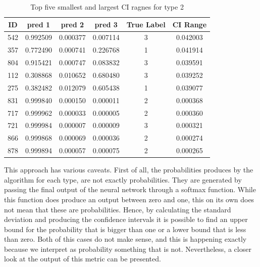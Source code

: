 \documentclass[11pt,twoside]{article}
\numberwithin{Theorem}{section}
\numberwithin{Definition}{section}
\numberwithin{Lemma}{section}
\numberwithin{Algorithm}{section}
\numberwithin{equation}{section}
\begin{document}
\begin{table}[]
\centering
\begin{tabular}{|c|lllcc|}
\hline
ID  & \multicolumn{1}{c}{pred 1}   & \multicolumn{1}{c}{pred 2}   & \multicolumn{1}{c}{pred 3} & True Label & CI Range \\ \hline
542 & 0.992509                     & 0.000377                     & 0.007114                   & 3          & 0.042003 \\
357 & \multicolumn{1}{r}{0.772490} & 0.000741                     & 0.226768                   & 1          & 0.041914 \\
804 & 0.915421                     & 0.000747                     & 0.083832                   & 3          & 0.039591 \\
112 & \multicolumn{1}{r}{0.308868} & 0.010652                     & 0.680480                   & 3          & 0.039252 \\
275 & 0.382482                     & \multicolumn{1}{r}{0.012079} & 0.605438                   & 1          & 0.039077 \\ \hline
831 & 0.999840                     & 0.000150                     & 0.000011                   & 2          & 0.000368 \\
717 & 0.999962                     & 0.000033                     & 0.000005                   & 2          & 0.000360 \\
721 & 0.999984                     & 0.000007                     & 0.000009                   & 3          & 0.000321 \\
866 & 0.999868                     & 0.000069                     & 0.000036                   & 2          & 0.000274 \\
878 & 0.999894                     & 0.000057                     & 0.000075                   & 2          & 0.000265 \\ \hline
\end{tabular}
\caption{Top five smallest and largest CI ragnes for \textsf{type 2}}
\label{tab:CI}
\end{table}

This approach has various caveats. First of all, the probabilities produces by the algorithm for each type, are not exactly probabilities. They are generated by passing the final output of the neural network through a softmax function. While this function does produce an output between zero and one, this on its own does not mean that these are probabilities. Hence, by calculating the standard deviation and producing the confidence intervals it is possible to find an upper bound for the probability that is bigger than one or a lower bound that is less than zero. Both of this cases do not make sense, and this is happening exactly because we interpret as probability something that is not. Nevertheless, a closer look at the output of this metric can be presented. 
\end{document}
